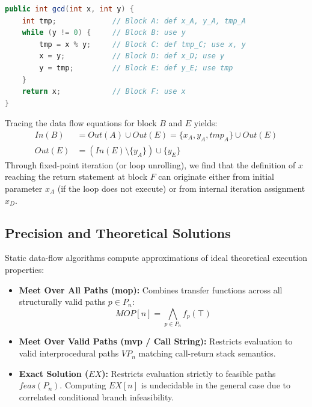 \begin{lstlisting}[language=Java]
public int gcd(int x, int y) {
    int tmp;             // Block A: def x_A, y_A, tmp_A
    while (y != 0) {     // Block B: use y
        tmp = x % y;     // Block C: def tmp_C; use x, y
        x = y;           // Block D: def x_D; use y
        y = tmp;         // Block E: def y_E; use tmp
    }
    return x;            // Block F: use x
}
\end{lstlisting}

Tracing the data flow equations for block $B$ and $E$ yields:
\begin{align}
In(B) &= Out(A) \cup Out(E) = \{x_A, y_A, tmp_A\} \cup Out(E)\\
Out(E) &= (In(E) \setminus \{y_A\}) \cup \{y_E\}
\end{align}
Through fixed-point iteration (or loop unrolling), we find that the definition of $x$ reaching the return statement at block $F$ can originate either from initial parameter $x_A$ (if the loop does not execute) or from internal iteration assignment $x_D$.

\subsection{Precision and Theoretical Solutions}
Static data-flow algorithms compute approximations of ideal theoretical execution properties:

\begin{itemize}
    \item \textbf{Meet Over All Paths (\gls{mop}):} Combines transfer functions across all structurally valid paths $p \in P_n$:
    \begin{equation}
    MOP[n] = \bigwedge_{p \in P_n} f_p(\top)
    \end{equation}
    \item \textbf{Meet Over Valid Paths (\gls{mvp} / Call String):} Restricts evaluation to valid interprocedural paths $VP_n$ matching call-return stack semantics.
    \item \textbf{Exact Solution ($EX$):} Restricts evaluation strictly to feasible paths $feas(P_n)$. Computing $EX[n]$ is undecidable in the general case due to correlated conditional branch infeasibility.
\end{itemize}

